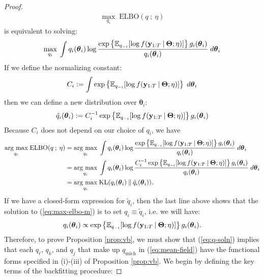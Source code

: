 \begin{proof}
\begin{align}
    \max_{q_i}  \; \text{ELBO}( q \:;\: \eta) \label{eq:max-elbo-m}
\end{align}
is equivalent to solving:
\begin{align*}
    \max_{q_i}  \; \int q_{i}(\boldsymbol{\theta}_i) \log \frac{\exp\left\{\mathbb{E}_{q_{-i}}[\log f(\mathbf{y}_{1:T}\:|\: \boldsymbol{\Theta};\eta)]\right\}g_{i}(\boldsymbol{\theta}_i)}{q_{i}(\boldsymbol{\theta}_i)} \; d\boldsymbol{\theta}_i
\end{align*}
If we define the normalizing constant:
\begin{align*}
    C_i := \int \exp\left\{\mathbb{E}_{q_{-i}}[\log f(\mathbf{y}_{1:T}\:|\: \boldsymbol{\Theta};\eta)]\right\} \; d\boldsymbol{\theta}_i
\end{align*}
then we can define a new distribution over $\boldsymbol{\theta}_i$:
\begin{align*}
    \tilde{q}_i(\boldsymbol{\theta}_i) := C^{-1}_i\exp\left\{\mathbb{E}_{q_{-i}}[\log f(\mathbf{y}_{1:T}\:|\: \boldsymbol{\Theta};\eta)]\right\}g_{i}(\boldsymbol{\theta}_i)
\end{align*}
Because $C_i$ does not depend on our choice of $q_i$, we have 
\begin{align*}
    \underset{q_i}{\text{\normalfont arg max}} \; \text{ELBO}( q \:;\: \eta) &= \underset{q_i}{\text{\normalfont arg max}} \; \int q_i(\boldsymbol{\theta}_i) \log \frac{\exp\left\{\mathbb{E}_{q_{-i}}[\log f(\mathbf{y}_{1:T}\:|\: \boldsymbol{\Theta};\eta)]\right\}g_i(\boldsymbol{\theta}_i)}{q_i(\boldsymbol{\theta}_i)} \; d\boldsymbol{\theta}_i\\
    &= \underset{q_i}{\text{\normalfont arg max}} \; \int q_i(\boldsymbol{\theta}_i) \log \frac{C^{-1}_i\exp\left\{\mathbb{E}_{q_{-i}}[\log f(\mathbf{y}_{1:T}\:|\: \boldsymbol{\Theta};\eta)]\right\}g_i(\boldsymbol{\theta}_i)}{q_i(\boldsymbol{\theta}_i)} \; d\boldsymbol{\theta}_i \\
    &=  \underset{q_i}{\text{\normalfont arg max}} \; \text{KL}(q_i(\boldsymbol{\theta}_i) \:\lVert\: \tilde{q}_i(\boldsymbol{\theta}_i)).
\end{align*}
If we have a closed-form expression for $\tilde{q}_i$, then the last line above shows that the solution to (\ref{eq:max-elbo-m}) is to set $q_i \equiv \tilde{q}_i$, i.e. we will have:
\begin{align}
    q_i(\boldsymbol{\theta}_i) \propto \exp\left\{\mathbb{E}_{q_{-i}}[\log f(\mathbf{y}_{1:T}\:|\: 
    \boldsymbol{\Theta};\eta)]\right\}g_i(\boldsymbol{\theta}_i). \label{eq:q-soln}
\end{align}
Therefore, to prove Proposition \ref{prop:vb}, we must show that (\ref{eq:q-soln}) implies that each $q_\ell$, $q_k$, and $q_j$ that make up $q_\text{mich}$ in (\ref{eq:mean-field}) have the functional forms specified in (i)-(iii) of Proposition \ref{prop:vb}. We begin by defining the key terms of the backfitting procedure:

\end{proof}
